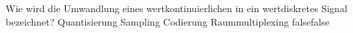     {Wie wird die Umwandlung eines wertkontinuierlichen in ein wertdiskretes Signal bezeichnet?}
    {Quantisierung}
    {Sampling}
    {Codierung}
    {Raummultiplexing}
    {false}{false}